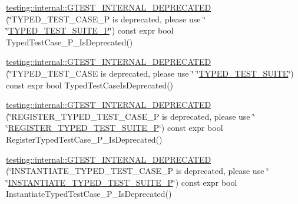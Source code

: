 \begin{DoxyCompactItemize}
$$\item 
\mbox{\hyperlink{namespacetesting_1_1internal_ac2bac410cd8b9ecbc8f4ccc921e61cee}{testing\+::internal\+::\+G\+T\+E\+S\+T\+\_\+\+I\+N\+T\+E\+R\+N\+A\+L\+\_\+\+D\+E\+P\+R\+E\+C\+A\+T\+ED}} (\char`\"{}T\+Y\+P\+E\+D\+\_\+\+T\+E\+S\+T\+\_\+\+C\+A\+S\+E\+\_\+P is deprecated, please use \char`\"{} \char`\"{}\mbox{\hyperlink{_obj__test_2lib_2googletest-master_2googletest_2test_2googletest-list-tests-unittest___8cc_a8ee0021cbd9bdfcb7c02ce2607805dfc}{T\+Y\+P\+E\+D\+\_\+\+T\+E\+S\+T\+\_\+\+S\+U\+I\+T\+E\+\_\+P}}\char`\"{}) const expr bool Typed\+Test\+Case\+\_\+\+P\+\_\+\+Is\+Deprecated()
\item 
\mbox{\hyperlink{namespacetesting_1_1internal_ac7c25a00ce37b8f6c7ea16814233b281}{testing\+::internal\+::\+G\+T\+E\+S\+T\+\_\+\+I\+N\+T\+E\+R\+N\+A\+L\+\_\+\+D\+E\+P\+R\+E\+C\+A\+T\+ED}} (\char`\"{}T\+Y\+P\+E\+D\+\_\+\+T\+E\+S\+T\+\_\+\+C\+A\+SE is deprecated, please use \char`\"{} \char`\"{}\mbox{\hyperlink{_obj__test_2lib_2googletest-master_2googletest_2test_2googletest-list-tests-unittest___8cc_a346de8e681bc95011fed254a54e30205}{T\+Y\+P\+E\+D\+\_\+\+T\+E\+S\+T\+\_\+\+S\+U\+I\+TE}}\char`\"{}) const expr bool Typed\+Test\+Case\+Is\+Deprecated()
\item 
\mbox{\hyperlink{namespacetesting_1_1internal_ad10c37bd148fb8988a1d99e127891203}{testing\+::internal\+::\+G\+T\+E\+S\+T\+\_\+\+I\+N\+T\+E\+R\+N\+A\+L\+\_\+\+D\+E\+P\+R\+E\+C\+A\+T\+ED}} (\char`\"{}R\+E\+G\+I\+S\+T\+E\+R\+\_\+\+T\+Y\+P\+E\+D\+\_\+\+T\+E\+S\+T\+\_\+\+C\+A\+S\+E\+\_\+P is deprecated, please use \char`\"{} \char`\"{}\mbox{\hyperlink{_obj__test_2lib_2googletest-master_2googletest_2test_2googletest-list-tests-unittest___8cc_a24c35f734ffc5235cc3881d22717d506}{R\+E\+G\+I\+S\+T\+E\+R\+\_\+\+T\+Y\+P\+E\+D\+\_\+\+T\+E\+S\+T\+\_\+\+S\+U\+I\+T\+E\+\_\+P}}\char`\"{}) const expr bool Register\+Typed\+Test\+Case\+\_\+\+P\+\_\+\+Is\+Deprecated()
\item 
\mbox{\hyperlink{namespacetesting_1_1internal_ab9dabaaecfb36c469b3382a169a581db}{testing\+::internal\+::\+G\+T\+E\+S\+T\+\_\+\+I\+N\+T\+E\+R\+N\+A\+L\+\_\+\+D\+E\+P\+R\+E\+C\+A\+T\+ED}} (\char`\"{}I\+N\+S\+T\+A\+N\+T\+I\+A\+T\+E\+\_\+\+T\+Y\+P\+E\+D\+\_\+\+T\+E\+S\+T\+\_\+\+C\+A\+S\+E\+\_\+P is deprecated, please use \char`\"{} \char`\"{}\mbox{\hyperlink{_obj__test_2lib_2googletest-master_2googletest_2test_2googletest-list-tests-unittest___8cc_afbb047642153cc08001200d1c24f278a}{I\+N\+S\+T\+A\+N\+T\+I\+A\+T\+E\+\_\+\+T\+Y\+P\+E\+D\+\_\+\+T\+E\+S\+T\+\_\+\+S\+U\+I\+T\+E\+\_\+P}}\char`\"{}) const expr bool Instantiate\+Typed\+Test\+Case\+\_\+\+P\+\_\+\+Is\+Deprecated()
\end{DoxyCompactItemize}
